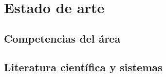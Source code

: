 \chapter{Estado de arte}
\label{chap:estado-de-arte}
\section{Competencias del área}
\section{Literatura científica y sistemas}
\label{sec:literatura}





